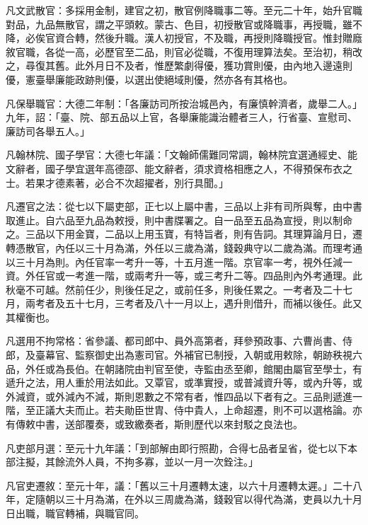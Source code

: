 \begin{pinyinscope}
 凡文武散官：多採用金制，建官之初，散官例降職事二等。至元二十年，始升官職對品，九品無散官，謂之平頭敕。蒙古、色目，初授散官或降職事，再授職，雖不降，必俟官資合轉，然後升職。漢人初授官，不及職，再授則降職授官。惟封贈廕敘官職，各從一高，必歷官至二品，則官必從職，不復用理算法矣。至治初，稍改之，尋復其舊。此外月日不及者，惟歷繁劇得優，獲功賞則優，由內地入邊遠則優，憲臺舉廉能政跡則優，以選出使絕域則優，然亦各有其格也。



 凡保舉職官：大德二年制：「各廉訪司所按治城邑內，有廉慎幹濟者，歲舉二人。」九年，詔：「臺、院、部五品以上官，各舉廉能識治體者三人，行省臺、宣慰司、廉訪司各舉五人。」



 凡翰林院、國子學官：大德七年議：「文翰師儒難同常調，翰林院宜選通經史、能文辭者，國子學宜選年高德邵、能文辭者，須求資格相應之人，不得預保布衣之士。若果才德素著，必合不次超擢者，別行具聞。」



 凡遷官之法：從七以下屬吏部，正七以上屬中書，三品以上非有司所與奪，由中書取進止。自六品至九品為敕授，則中書牒署之。自一品至五品為宣授，則以制命之。三品以下用金寶，二品以上用玉寶，有特旨者，則有告詞。其理算論月日，遷轉憑散官，內任以三十月為滿，外任以三歲為滿，錢穀典守以二歲為滿。而理考通以三十月為則。內任官率一考升一等，十五月進一階。京官率一考，視外任減一資。外任官或一考進一階，或兩考升一等，或三考升二等。四品則內外考通理。此秋毫不可越。然前任少，則後任足之，或前任多，則後任累之。一考者及二十七月，兩考者及五十七月，三考者及八十一月以上，遇升則借升，而補以後任。此又其權衡也。



 凡選用不拘常格：省參議、都司郎中、員外高第者，拜參預政事、六曹尚書、侍郎，及臺幕官、監察御史出為憲司官。外補官已制授，入朝或用敕除，朝跡秩視六品，外任或為長伯。在朝諸院由判官至使，寺監由丞至卿，館閣由屬官至學士，有遞升之法，用人重於用法如此。又覃官，或準實授，或普減資升等，或內升等，或外減資，或外減內不減，斯則恩數之不常有者，惟四品以下者有之。三品則遞進一階，至正議大夫而止。若夫勛臣世胄、侍中貴人，上命超遷，則不可以選格論。亦有傳敕中書，送部覆奏，或致繳奏者，斯則歷代以來封駁之良法也。



 凡吏部月選：至元十九年議：「到部解由即行照勘，合得七品者呈省，從七以下本部注擬，其餘流外人員，不拘多寡，並以一月一次銓注。」



 凡官吏遷敘：至元十年，議：「舊以三十月遷轉太速，以六十月遷轉太遲。」二十八年，定隨朝以三十月為滿，在外以三周歲為滿，錢穀官以得代為滿，吏員以九十月日出職，職官轉補，與職官同。




\end{pinyinscope}
